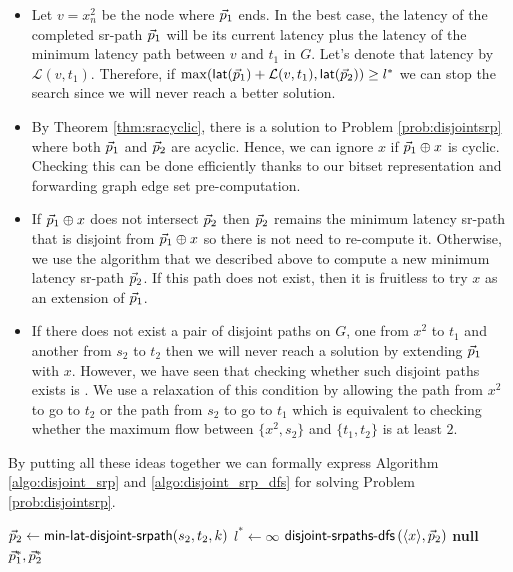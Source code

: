 \begin{itemize}
 \item Let $v = x^2_n$ be the node where $\vec{p}_1$ ends. In the best case, the latency
 of the completed sr-path $\vec{p}_1$ will be its current latency plus the latency of the minimum
 latency path between $v$ and $t_1$ in $G$. Let's denote that latency by $\mathcal{L}(v, t_1)$.
 Therefore, if $\max(\mathsf{lat}(\vec{p}_1) + \mathcal{L}(v, t_1), \mathsf{lat}(\vec{p}_2)) \geq l^*$
 we can stop the search since we will never reach a better solution.
 
 \item By Theorem \ref{thm:sracyclic}, there is
 a solution to Problem \ref{prob:disjointsrp} where both $\vec{p}_1$ and $\vec{p}_2$ are acyclic.
 Hence, we can ignore $x$ if $\vec{p}_1 \oplus x$ is cyclic. Checking this can be 
 done efficiently thanks to our bitset representation and forwarding graph
 edge set pre-computation.
 
 \item If $\vec{p}_1 \oplus x$ does not intersect 
 $\vec{p}_2$ then $\vec{p}_2$ remains the minimum latency sr-path that is disjoint from
 $\vec{p}_1 \oplus x$ so there is not need to re-compute it. Otherwise, we use the algorithm
 that we described above to compute a new minimum latency sr-path $\vec{p}_2$. If this path does
 not exist, then it is fruitless to try $x$ as an extension of $\vec{p}_1$.
 
 \item If there does not exist a pair of disjoint paths
 on $G$, one from $x^2$ to $t_1$ and another from $s_2$ to $t_2$ then we will never reach a 
 solution by extending $\vec{p}_1$ with $x$. However, we have seen that checking whether
 such disjoint paths exists is \NPcomplete. We use a relaxation of this condition by allowing
 the path from $x^2$ to go to $t_2$ or the path from $s_2$ to go to $t_1$ which is equivalent
 to checking whether the maximum flow between $\{x^2, s_2\}$ and $\{t_1, t_2\}$ is
 at least $2$.
\end{itemize}

By putting all these ideas together we can formally express Algorithm
\ref{algo:disjoint_srp} and \ref{algo:disjoint_srp_dfs} for solving Problem
\ref{prob:disjointsrp}.

\begin{algorithm}[t]
\small
\caption{$\textsf{disjoint-srpaths}\left( g, s_1, s_2, t_1, t_2 \right)$}
\begin{algorithmic}[1]
\STATE $\vec{p}_2 \gets \textsf{min-lat-disjoint-srpath}(s_2, t_2, k)$
\STATE $l^* \gets \infty$
  \STATE $\textsf{disjoint-srpaths-dfs}\left( \langle x \rangle, \vec{p}_2 \right)$
\ENDFOR
{}
  \RETURN \textbf{null}
\ENDIF
\RETURN $\vec{p}^*_1, \vec{p}^*_2$
\end{algorithmic}
\label{algo:disjoint_srp}
\end{algorithm}

